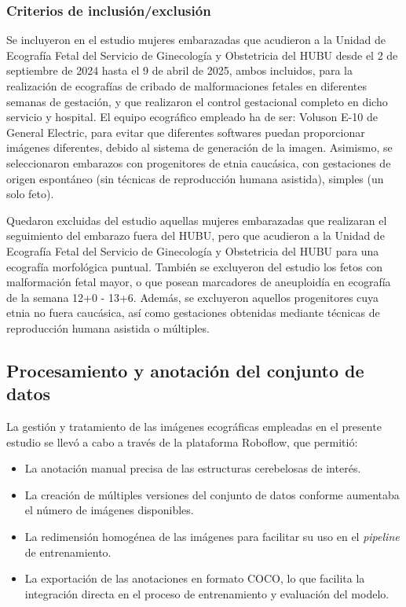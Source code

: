 \subsubsection{Criterios de inclusión/exclusión}
Se incluyeron en el estudio mujeres embarazadas que acudieron a la Unidad de Ecografía Fetal del Servicio de Ginecología y Obstetricia del HUBU desde el 2 de septiembre de 2024 hasta el 9 de abril de 2025, ambos incluidos, para la realización de ecografías de cribado de malformaciones fetales en diferentes semanas de gestación, y que realizaron el control gestacional completo en dicho servicio y hospital. El equipo ecográfico empleado ha de ser: Voluson E-10 de General Electric, para evitar que diferentes softwares puedan proporcionar imágenes diferentes, debido al sistema de generación de la imagen. Asimismo, se seleccionaron embarazos con progenitores de etnia caucásica, con gestaciones de origen espontáneo (sin técnicas de reproducción humana asistida), simples (un solo feto).

Quedaron excluidas del estudio aquellas mujeres embarazadas que realizaran el seguimiento del embarazo fuera del HUBU, pero que acudieron a la Unidad de Ecografía Fetal del Servicio de Ginecología y Obstetricia del HUBU para una ecografía morfológica puntual. También se excluyeron del estudio los fetos con malformación fetal mayor, o que posean marcadores de aneuploidía en ecografía de la semana 12+0 - 13+6. Además, se excluyeron aquellos progenitores cuya etnia no fuera caucásica, así como gestaciones obtenidas mediante técnicas de reproducción humana asistida o múltiples. 

\subsection{Procesamiento y anotación del conjunto de datos}
La gestión y tratamiento de las imágenes ecográficas empleadas en el presente estudio se llevó a cabo a través de la plataforma Roboflow, que permitió:
\begin{itemize}
    \item La anotación manual precisa de las estructuras cerebelosas de interés.
    \item La creación de múltiples versiones del conjunto de datos conforme aumentaba el número de imágenes disponibles.
    \item La redimensión homogénea de las imágenes para facilitar su uso en el \textit{pipeline} de entrenamiento.
    \item La exportación de las anotaciones en formato COCO, lo que facilita la integración directa en el proceso de entrenamiento y evaluación del modelo.
\end{itemize}  

